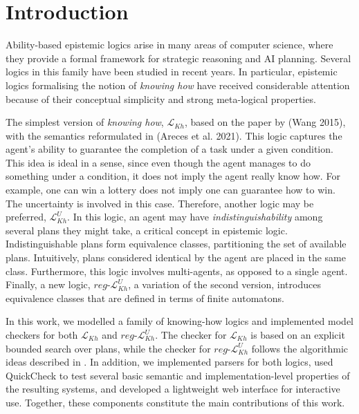 \section{Introduction}

Ability-based epistemic logics arise in many areas of computer science, where they provide a formal framework for strategic reasoning and AI planning. Several logics in this family have been studied in recent years. In particular, epistemic logics formalising the notion of \textit{knowing how} have received considerable attention because of their conceptual simplicity and strong meta-logical properties.\par
The simplest version of \textit{knowing how}, $\mathcal{L}_{Kh}$, based on the paper by (Wang 2015\cite{Wang2015}), with the semantics reformulated in (Areces et al. 2021\cite{Areces2021}). 
This logic captures the agent's ability to guarantee the completion of a task under a given condition. 
This idea is ideal in a sense, since even though the agent manages to do something under a condition, it does not imply the agent really know how. 
For example, one can win a lottery does not imply one can guarantee how to win. The uncertainty is involved in this case. 
Therefore, another logic may be preferred, $\mathcal{L}^U_{Kh}$. In this logic, an agent may have \textit{indistinguishability} among several plans they might take, a critical concept in epistemic logic. 
Indistinguishable plans form equivalence classes, partitioning the set of available plans. Intuitively, plans considered identical by the agent are placed in the same class. 
Furthermore, this logic involves multi-agents, as opposed to a single agent. Finally, a new logic, $reg\text{-}\mathcal{L}^U_{Kh}$, a variation of the second version, 
introduces equivalence classes that are defined in terms of finite automatons. \par
In this work, we modelled a family of knowing-how logics and implemented model checkers for both $\mathcal{L}_{Kh}$ and $reg\text{-}\mathcal{L}^U_{Kh}$. The checker for $\mathcal{L}_{Kh}$ is based on an explicit bounded search over plans, while the checker for $reg\text{-}\mathcal{L}^U_{Kh}$ follows the algorithmic ideas described in \cite{Demri2023}. In addition, we implemented parsers for both logics, used QuickCheck to test several basic semantic and implementation-level properties of the resulting systems, and developed a lightweight web interface for interactive use. Together, these components constitute the main contributions of this work.